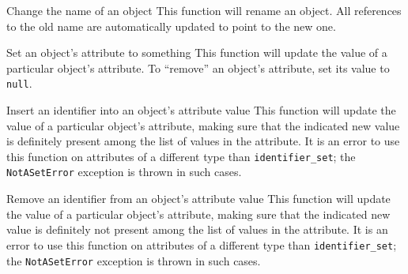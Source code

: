 \documentclass{article}
\begin{document}
    {}
    {Change the name of an object}
    {This function will rename an object.  All references to the old name are automatically updated to point to the new
    one.}

    {}
    {Set an object's attribute to something}
    {This function will update the value of a particular object's attribute.  To ``remove'' an object's attribute, set its
    value to {\tt null}.}

    {}
    {Insert an identifier into an object's attribute value}
    {This function will update the value of a particular object's attribute, making sure that the indicated new value is
    definitely present among the list of values in the attribute.  It is an error to use this function on attributes of
    a different type than {\tt identifier\_set}; the {\tt NotASetError} exception is thrown in such cases.}

    {}
    {Remove an identifier from an object's attribute value}
    {This function will update the value of a particular object's attribute, making sure that the indicated new value is
    definitely not present among the list of values in the attribute.  It is an error to use this function on attributes
    of a different type than {\tt identifier\_set}; the {\tt NotASetError} exception is thrown in such cases.}
\end{document}
